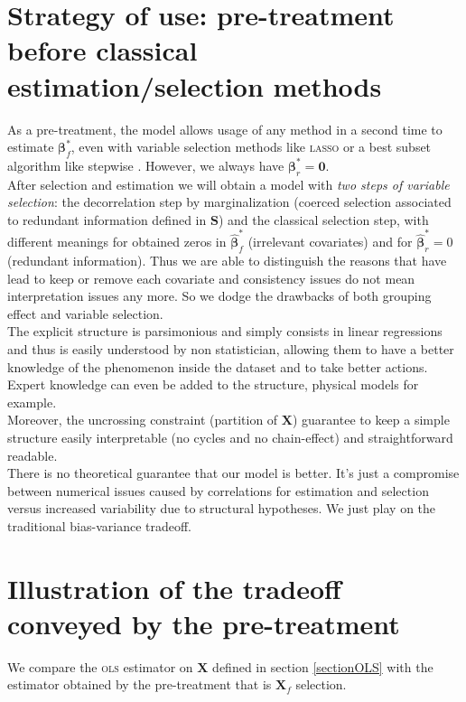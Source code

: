 \documentclass[12pt,a4paper]{report}
\begin{document}
\section{Strategy of use: pre-treatment before classical estimation/selection methods}\label{interpretation}

As a pre-treatment, the model allows usage of any method in a second time to estimate $\boldsymbol{\beta}_{f}^*$, even with variable selection methods like \textsc{lasso} or a best subset algorithm like stepwise \cite{seber2012linear}. However, we always have $\boldsymbol{\beta}^*_r=\boldsymbol{0}$.\\

After selection and estimation we will obtain a model with { \it two steps of variable selection}: the decorrelation step by marginalization (coerced selection associated to redundant information defined in $\boldsymbol{S}$) and the classical selection step, with different meanings for obtained zeros in $\hat{\boldsymbol{\beta}}^*_{f}$ (irrelevant covariates) and for $\hat{\boldsymbol{\beta}}^*_{r}=0$ (redundant information). 
 Thus we are able to distinguish the reasons that have lead to keep or remove each covariate and consistency issues do not mean interpretation issues any more. So we dodge the drawbacks of both grouping effect and variable selection.\\


The explicit structure is parsimonious and simply consists in linear regressions and thus is easily understood by non statistician, allowing them to have a better knowledge of the phenomenon inside the dataset and to take better actions. Expert knowledge can even be added to the structure, physical models for example.\\

Moreover, the uncrossing constraint (partition of $\boldsymbol{X}$) guarantee to keep a simple structure easily interpretable (no cycles and no chain-effect) and straightforward readable.\\
	
			There is no theoretical guarantee that our model is better. It's just a compromise between numerical issues caused by correlations for estimation and selection versus increased variability due to structural hypotheses. We just play on the traditional bias-variance tradeoff. 
			


	
	\section{Illustration of the tradeoff conveyed by the pre-treatment}	
	We compare the \textsc{ols} estimator on $\boldsymbol{X}$ defined in section \ref{sectionOLS} with the estimator obtained by the pre-treatment that is $\boldsymbol{X}_f$ selection.
  
\end{document}
